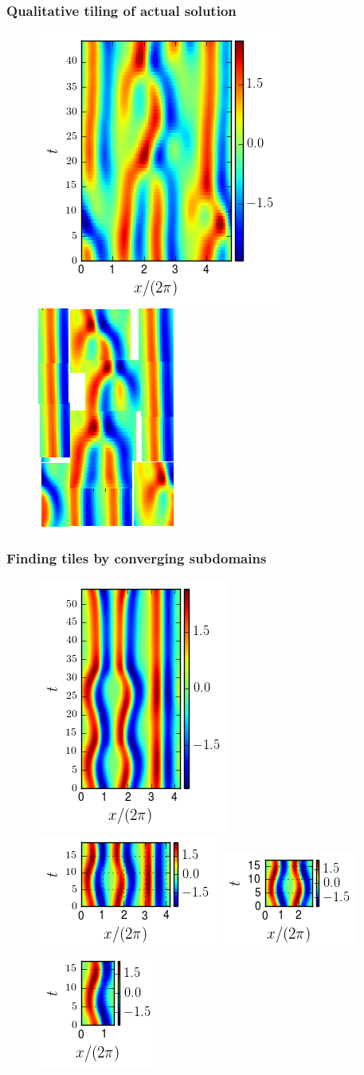 \documentclass[mathserif, handout]{beamer}
\begin{document}
\begin{frame}%
  \frametitle{Qualitative tiling of actual solution}
  \begin{figure}
  \includegraphics[width=.32\textwidth]{MNG_ppo_L30_T44}
  \includegraphics[width=.32\textwidth]{MNG_ppo_frankenstein}
  \end{figure}
\end{frame}

\begin{frame}%
  \frametitle{Finding tiles by converging subdomains}
  \begin{figure}
  \includegraphics[width=.2\textwidth]{gap0}
  \includegraphics[width=.2\textwidth]{gap1}
  \includegraphics[width=.2\textwidth]{gap2}
  \includegraphics[width=.2\textwidth]{MNG_gap_final}
  \end{figure}
\end{frame}
\end{document}
